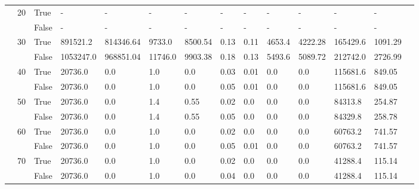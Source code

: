 \begin{appendices}
\begin{landscape}
\begin{small}
\begin{longtable}[c]{@{}lll|ll|ll|ll|ll|lll@{}}
   & 20 & True  & -               & -              & -             & -             & -             & -             & -             & -             & -             & -           &  \\
   &    & False & -               & -              & -             & -             & -             & -             & -             & -             & -             & -           &  \\
   & 30 & True  & 891521.2        & 814346.64      & 9733.0        & 8500.54       & 0.13          & 0.11          & 4653.4        & 4222.28       & 165429.6      & 1091.29     &  \\
   &    & False & 1053247.0       & 968851.04      & 11746.0       & 9903.38       & 0.18          & 0.13          & 5493.6        & 5089.72       & 212742.0      & 2726.99     &  \\
   & 40 & True  & 20736.0         & 0.0            & 1.0           & 0.0           & 0.03          & 0.01          & 0.0           & 0.0           & 115681.6      & 849.05      &  \\
   &    & False & 20736.0         & 0.0            & 1.0           & 0.0           & 0.05          & 0.01          & 0.0           & 0.0           & 115681.6      & 849.05      &  \\
   & 50 & True  & 20736.0         & 0.0            & 1.4           & 0.55          & 0.02          & 0.0           & 0.0           & 0.0           & 84313.8       & 254.87      &  \\
   &    & False & 20736.0         & 0.0            & 1.4           & 0.55          & 0.05          & 0.0           & 0.0           & 0.0           & 84329.8       & 258.78      &  \\
   & 60 & True  & 20736.0         & 0.0            & 1.0           & 0.0           & 0.02          & 0.0           & 0.0           & 0.0           & 60763.2       & 741.57      &  \\
   &    & False & 20736.0         & 0.0            & 1.0           & 0.0           & 0.05          & 0.01          & 0.0           & 0.0           & 60763.2       & 741.57      &  \\
   & 70 & True  & 20736.0         & 0.0            & 1.0           & 0.0           & 0.02          & 0.0           & 0.0           & 0.0           & 41288.4       & 115.14      &  \\
   &    & False & 20736.0         & 0.0            & 1.0           & 0.0           & 0.04          & 0.0           & 0.0           & 0.0           & 41288.4       & 115.14      &  \\

\end{longtable}
\end{small}
\end{landscape}
\end{appendices}
